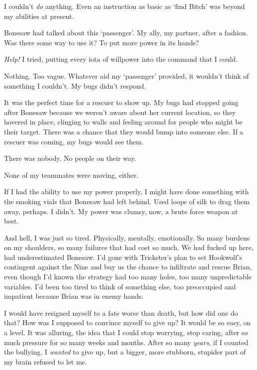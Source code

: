I couldn't \emph{do} anything.  Even an instruction as basic as `find Bitch' was beyond my abilities at present.



Bonesaw had talked about this `passenger'.  My ally, my partner, after a fashion.  Was there some way to use it?  To put more power in its hands?



\emph{Help!}  I tried, putting every iota of willpower into the command that I could.



Nothing.  Too vague.  Whatever aid my `passenger' provided, it wouldn't think of something I couldn't.  My bugs didn't respond.



It was the perfect time for a rescuer to show up.  My bugs had stopped going after Bonesaw because we weren't aware about her current location, so they hovered in place, clinging to walls and feeling around for people who might be their target.  There was a chance that they would bump into someone else.  If a rescuer was coming, my bugs would see them.



There was nobody.  No people on their way.



None of my teammates were moving, either.



If I had the ability to use my power properly, I might have done something with the smoking vials that Bonesaw had left behind.  Used loops of silk to drag them away, perhaps.  I didn't.  My power was clumsy, now, a brute force weapon at best.



And hell, I was just so tired.  Physically, mentally, emotionally.  So many burdens on my shoulders, so many failures that had cost so much.  We had fucked up here, had underestimated Bonesaw.  I'd gone with Trickster's plan to set Hookwolf's contingent against the Nine and buy us the chance to infiltrate and rescue Brian, even though I'd known the strategy had too many holes, too many unpredictable variables.  I'd been too tired to think of something else, too preoccupied and impatient because Brian was in enemy hands.



I would have resigned myself to a fate worse than death, but how did one do that?  How was I supposed to convince myself to give up?  It would be so easy, on a level.  It was alluring, the idea that I could stop worrying, stop caring, after so much pressure for so many weeks and months.  After so many \emph{years}, if I counted the bullying.  I \emph{wanted} to give up, but a bigger, more stubborn, stupider part of my brain refused to let me.



